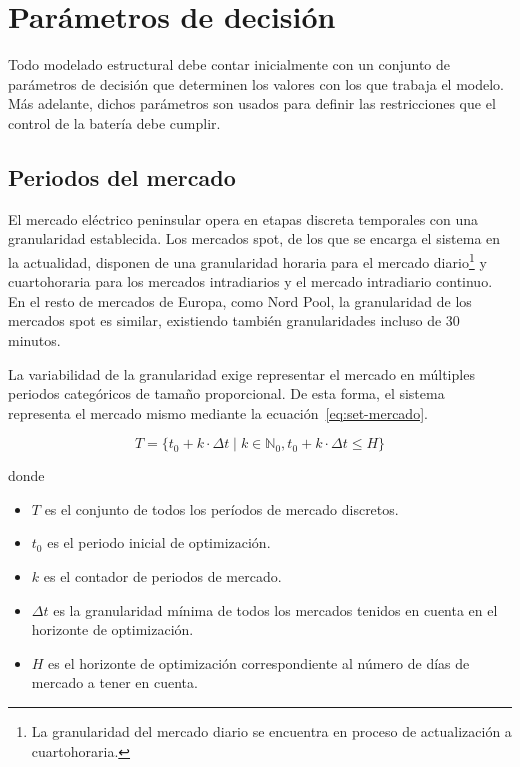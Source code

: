 \section{Parámetros de decisión}
\label{makereference5.1}

Todo modelado estructural debe contar inicialmente con un conjunto de parámetros de decisión que determinen los valores con los que trabaja el modelo. Más adelante, dichos parámetros son usados para definir las restricciones que el control de la batería debe cumplir.

\subsection{Periodos del mercado}
\label{makereference5.1.1}

El mercado eléctrico peninsular opera en etapas discreta temporales con una granularidad establecida. Los mercados spot, de los que se encarga el sistema en la actualidad, disponen de una granularidad horaria para el mercado diario\footnote{La granularidad del mercado diario se encuentra en proceso de actualización a cuartohoraria.} y cuartohoraria para los mercados intradiarios y el mercado intradiario continuo. En el resto de mercados de Europa, como Nord Pool, la granularidad de los mercados spot es similar, existiendo también granularidades incluso de 30 minutos.

La variabilidad de la granularidad exige representar el mercado en múltiples periodos categóricos de tamaño proporcional. De esta forma, el sistema representa el mercado mismo mediante la ecuación~\ref{eq:set-mercado}.

\begin{samepage}

  \begin{equation}
    \label{eq:set-mercado}
    T = \{t_{0} + k \cdot \Delta t \mid k \in \mathbb{N}_{0}, t_{0} + k \cdot \Delta t \leq H\}
  \end{equation}

  donde

  \begin{itemize}

    \item \( T \) es el conjunto de todos los períodos de mercado discretos.

    \item \( t_{0} \) es el periodo inicial de optimización.

    \item \( k \) es el contador de periodos de mercado.

    \item \( \Delta t \) es la granularidad mínima de todos los mercados tenidos en cuenta en el horizonte de optimización.

    \item \( H \) es el horizonte de optimización correspondiente al número de días de mercado a tener en cuenta.

  \end{itemize}

\end{samepage}

